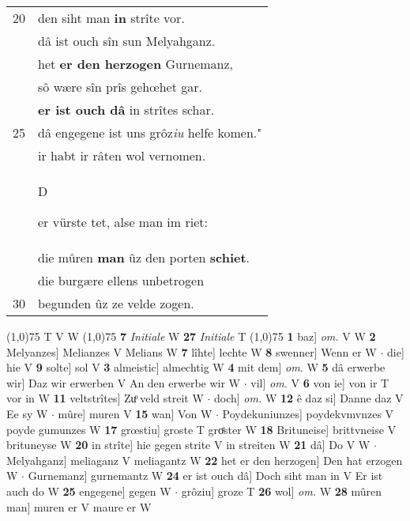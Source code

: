 \documentclass[8pt,a4paper,notitlepage]{article}
\begin{document}
\begin{table}[ht]
\begin{minipage}[t]{0.5\linewidth}
\begin{tabular}{rl}
20 & den siht man \textbf{in} strîte vor.\\ 
 & dâ ist ouch sîn sun Melyahganz.\\ 
 & het \textbf{er den herzogen} Gurnemanz,\\ 
 & sô wære sîn prîs gehœhet gar.\\ 
 & \textbf{er ist ouch dâ} in strîtes schar.\\ 
25 & dâ engegene ist uns grôz\textit{iu} helfe komen."\\ 
 & ir habt ir râten wol vernomen.\\ 
 & \begin{large}D\end{large}er vürste tet, alse man im riet:\\ 
 & die mûren \textbf{man} ûz den porten \textbf{schiet}.\\ 
 & die burgære ellens unbetrogen\\ 
30 & begunden ûz ze velde zogen.\\ 
\end{tabular}
\scriptsize
\line(1,0){75} \newline
T V W \newline
\line(1,0){75} \newline
\textbf{7} \textit{Initiale} W  \textbf{27} \textit{Initiale} T  \newline
\line(1,0){75} \newline
\textbf{1} baz] \textit{om.} V W \textbf{2} Melyanzes] Melianzes V Melians W \textbf{7} lîhte] lechte W \textbf{8} swenner] Wenn er W  $\cdot$ die] hie V \textbf{9} solte] sol V \textbf{3} almeistic] almechtig W \textbf{4} mit dem] \textit{om.} W \textbf{5} dâ erwerbe wir] Daz wir erwerben V An den erwerbe wir W  $\cdot$ vil] \textit{om.} V \textbf{6} von ie] von ir T vor in W \textbf{11} veltstrîtes] Zuͦ veld streit W  $\cdot$ doch] \textit{om.} W \textbf{12} ê daz si] Danne daz V Ee sy W  $\cdot$ mûre] muren V \textbf{15} wan] Von W  $\cdot$ Poydekuniunzes] poydekvmvnzes V poyde gumunzes W \textbf{17} grœstiu] groste T groͤster W \textbf{18} Brituneise] brittvneise V brituneyse W \textbf{20} in strîte] hie gegen strite V in streiten W \textbf{21} dâ] Do V W  $\cdot$ Melyahganz] meliaganz V meliagantz W \textbf{22} het er den herzogen] Den hat erzogen W  $\cdot$ Gurnemanz] gurnemantz W \textbf{24} er ist ouch dâ] Doch siht man in V Er ist auch do W \textbf{25} engegene] gegen W  $\cdot$ grôziu] groze T \textbf{26} wol] \textit{om.} W \textbf{28} mûren man] muren er V maure er W \newline
\end{minipage}
\end{table}
\end{document}
